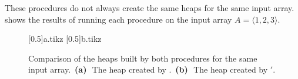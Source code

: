 These procedures do not always create the same heaps for the same input array.
 shows the results of running each procedure on the input array $A=\langle1,2,3\rangle$.
\begin{figure}[htb]
    \subcaptionbox{\label{fig:6-1a}}[0.5\textwidth]{{a.tikz}}
    \subcaptionbox{\label{fig:6-1b}}[0.5\textwidth]{{b.tikz}}
    \caption{Comparison of the heaps built by both procedures for the same input array.\,
    \textbf{(a)}\,~The heap created by .\,
    \textbf{(b)}\,~The heap created by $'$.} \label{fig:6-1}
\end{figure}
